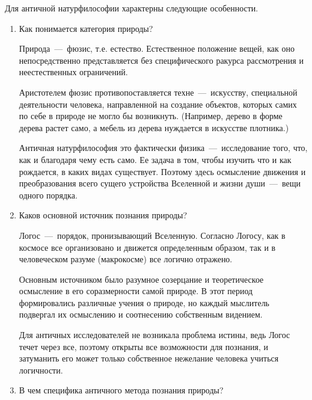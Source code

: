 Для античной натурфилософии характерны следующие особенности. 
\begin{enumerate}
\item Как понимается категория природы?

Природа~---~фюзис, т.е. естество. Естественное положение вещей, как оно непосредственно представляется без специфического ракурса рассмотрения и неестественных ограничений.

Аристотелем фюзис противопоставляется техне~---~искусству, специальной деятельности человека, направленной на создание объектов, которых самих по себе в природе не
могло бы возникнуть. (Например, дерево в форме дерева растет само, а мебель из дерева нуждается в искусстве плотника.)

Античная натурфилософия это фактически физика~---~исследование того, что, как и благодаря чему есть само. Ее задача в том, чтобы изучить что и как рождается, в каких видах существует. Поэтому здесь осмысление движения и преобразования всего сущего устройства Вселенной и жизни души~---~вещи одного порядка.

\item Каков основной источник познания природы?

Логос~---~порядок, пронизывающий Вселенную. Согласно Логосу, как в космосе все организовано и движется определенным образом, так и в человеческом разуме (макрокосме) все логично отражено.

Основным источником было разумное созерцание и теоретическое осмысление в его соразмерности самой природе. В этот период формировались различные учения о природе, но каждый мыслитель подвергал их осмыслению и соотнесению собственным видением. 


Для античных исследователей не возникала проблема истины, ведь Логос течет через все, поэтому открыты все возможности для познания, и затуманить его может только собственное нежелание человека учиться логичности. 

\item В чем специфика античного метода познания природы? 


\end{enumerate}
